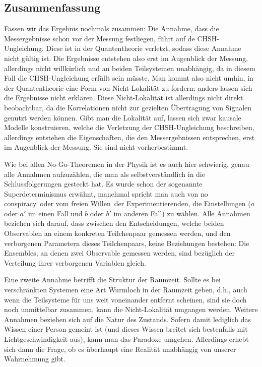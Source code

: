 \subsection{Zusammenfassung}

Fassen wir das Ergebnis nochmals zusammen: Die Annahme, dass die
Messergebnisse schon vor der Messung festliegen, f\"uhrt auf de CHSH-Ungleichung.
Diese ist in der Quantentheorie verletzt, sodass diese Annahme nicht g\"ultig
ist. Die Ergebnisse entstehen also erst im Augenblick der Messung, allerdings
nicht willk\"urlich und an beiden Teilsystemen unabh\"angig, da in diesem Fall
die CHSH-Ungleichung erf\"ullt sein m\"usste. Man kommt also nicht umhin,
in der Quantentheorie eine Form von Nicht-Lokalit\"at zu fordern; anders lassen sich
die Ergebnisse nicht erkl\"aren. Diese Nicht-Lokalit\"at ist allerdings nicht
direkt beobachtbar, da die Korrelationen nicht zur gezielten \"Ubertragung von
Signalen genutzt werden k\"onnen. Gibt man die Lokalit\"at auf, lassen sich
zwar kausale Modelle konstruieren, welche die Verletzung der CHSH-Ungleichung
beschreiben, allerdings entstehen die Eigenschaften, die den Messergebnissen  
entsprechen, erst im Augenblick der Messung. Sie sind nicht vorherbestimmt.

Wie bei allen No-Go-Theoremen in der Physik ist es auch hier schwierig, genau
alle Annahmen aufzuz\"ahlen, die man als selbstverst\"andlich in die Schlussfolgerungen
gesteckt hat. Es wurde schon der sogenannte Superdeterminismus erw\"ahnt,
manchmal spricht man auch von \glqq no conspiracy\glqq\ oder vom \glqq freien Willen\grqq\
der Experimentierenden, die Einstellungen ($a$ oder $a'$ im einen Fall und $b$ oder $b'$
im anderen Fall) zu w\"ahlen. Alle Annahmen beziehen sich darauf, dass zwischen 
den Entscheidungen, welche beiden Observablen an einem konkreten Teilchenpaar
gemessen werden, und den verborgenen Parametern dieses Teilchenpaars, keine
Beziehungen bestehen: Die Ensembles, an denen zwei Observable gemessen werden,
sind bez\"uglich der Verteilung ihrer verborgenen Variablen gleich. 
 
Eine zweite Annahme betrifft die Struktur der Raumzeit. Sollte es bei verschr\"ankten
Systemen eine Art Wurmloch in der Raumzeit geben, d.h., auch wenn die Teilsysteme
f\"ur uns weit voneinander entfernt scheinen, sind sie doch noch unmittelbar zusammen,
kann die Nicht-Lokalit\"at umgangen werden. Weitere Annahmen beziehen sich auf
die Natur des \glqq Zustands\grqq. Sofern damit lediglich das Wissen einer Person gemeint
ist (und dieses Wissen breitet sich bestenfalls mit Lichtgeschwindigkeit aus), kann man
das Paradoxe umgehen. Allerdings erhebt sich dann die Frage, ob es \"uberhaupt
eine Realit\"at unabh\"angig von unserer Wahrnehmung gibt. 

